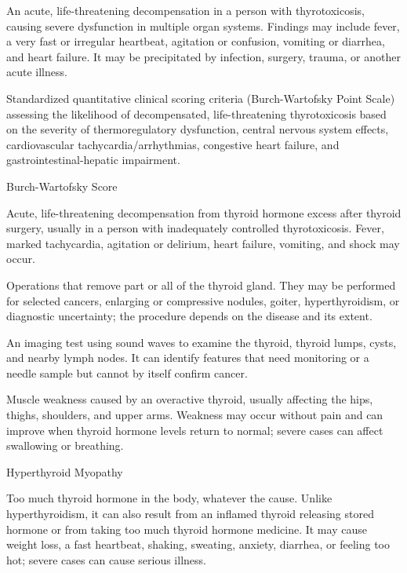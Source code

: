  An acute, life-threatening decompensation in a person with thyrotoxicosis, causing severe dysfunction in multiple organ systems. Findings may include fever, a very fast or irregular heartbeat, agitation or confusion, vomiting or diarrhea, and heart failure. It may be precipitated by infection, surgery, trauma, or another acute illness.

 Standardized quantitative clinical scoring criteria (Burch-Wartofsky Point Scale) assessing the likelihood of decompensated, life-threatening thyrotoxicosis based on the severity of thermoregulatory dysfunction, central nervous system effects, cardiovascular tachycardia/arrhythmias, congestive heart failure, and gastrointestinal-hepatic impairment.

\synonyms
Burch-Wartofsky Score

 Acute, life-threatening decompensation from thyroid hormone excess after thyroid surgery, usually in a person with inadequately controlled thyrotoxicosis. Fever, marked tachycardia, agitation or delirium, heart failure, vomiting, and shock may occur.

 Operations that remove part or all of the thyroid gland. They may be performed for selected cancers, enlarging or
compressive nodules, goiter, hyperthyroidism, or diagnostic uncertainty; the procedure
depends on the disease and its extent.

 An imaging test using sound waves to examine the thyroid, thyroid lumps, cysts, and nearby lymph nodes. It can identify features that need monitoring or a needle sample but cannot by itself confirm cancer.

 Muscle weakness caused by an overactive thyroid, usually affecting the hips, thighs, shoulders, and upper arms. Weakness may occur without pain and can improve when thyroid hormone levels return to normal; severe cases can affect swallowing or breathing.

\synonyms
Hyperthyroid Myopathy

 Too much thyroid hormone in the body, whatever the cause. Unlike hyperthyroidism, it can also result from an inflamed thyroid releasing stored hormone or from taking too much thyroid hormone medicine. It may cause weight loss, a fast heartbeat, shaking, sweating, anxiety, diarrhea, or feeling too hot; severe cases can cause serious illness.

